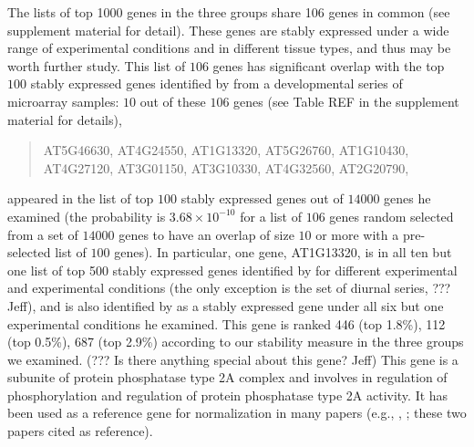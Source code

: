 \documentclass[letterpaper,12pt]{article}
\begin{document}

The lists of top 1000 genes in the three groups share 106 genes in common (see supplement material for detail).  These
genes are stably expressed under a wide range of experimental conditions and
in different tissue types, and thus may be worth further study. This list of
$106$ genes has significant overlap with the top $100$ stably expressed genes
identified by \cite{czechowski2005genome} from a developmental series of
microarray samples: $10$ out of these $106$ genes (see Table REF in the
supplement material for details),
\begin{center}
\begin{quote}
	AT5G46630, AT4G24550, AT1G13320, AT5G26760, AT1G10430, \\
	AT4G27120, AT3G01150, AT3G10330, AT4G32560, AT2G20790,
\end{quote}
\end{center}
appeared in the list of top $100$ stably expressed genes
out of $14000$ genes he examined (the probability is $3.68\times10^{-10}$ for
a list of $106$ genes random selected from a set of $14000$ genes to have an
overlap of size $10$ or more with a pre-selected list of $100$ genes). In
particular, one gene, AT1G13320, is in all ten but one list of top 500 stably
expressed genes identified by \cite{czechowski2005genome} for different
experimental and experimental conditions (the only exception is the set of
diurnal series, ??? Jeff), and is also identified by
\cite{hong2010identification} as a stably expressed gene under all six but one
experimental conditions he examined.  This gene is ranked 446 (top 1.8\%), 112
(top 0.5\%), 687 (top 2.9\%) according to our stability measure in the three
groups we examined.  (??? Is there anything special about this gene? Jeff)
This gene is a subunite of protein phosphatase type 2A complex and involves in
regulation of phosphorylation and regulation of protein phosphatase type 2A
activity. It has been used as a reference gene for normalization in many
papers (e.g., \cite{bournier2013arabidopsis}, \cite{baron2012transcriptional};
these two papers cited \cite{czechowski2005genome} as reference). 

\end{document}
